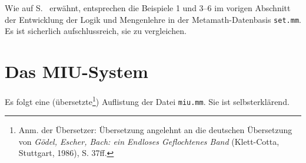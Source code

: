 Wie auf S.~\pageref{exampleref} erwähnt, entsprechen die Beispiele 1 und 3--6 im vorigen Abschnitt der Entwicklung der Logik und Mengenlehre in der Metamath-Datenbasis \texttt{set.mm}. Es ist sicherlich aufschlussreich, sie zu vergleichen. 


\chapter{Das MIU-System}
\label{MIU}

Es folgt eine (übersetzte\footnote{Anm. der Übersetzer: Übersetzung angelehnt an die deutschen Übersetzung von \textit{Gödel, Escher, Bach: ein Endloses Geflochtenes Band} (Klett-Cotta, Stuttgart, 1986), S. 37ff.}) Auflistung der Datei \texttt{miu.mm}.  Sie ist selbsterklärend.


